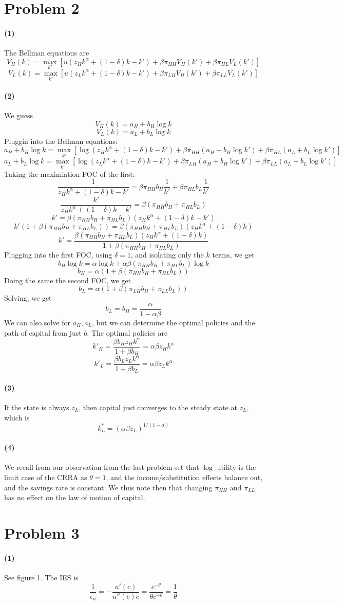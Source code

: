 \documentclass[10pt,letter]{article}
\newcommand{\problem}[1]{\section*{Problem #1}}
\newcommand{\problempart}[1]{\paragraph{#1}}
\begin{document}
\problem{2}
\problempart{(1)} The Bellman equations are
\[ V_H(k) = \max_{k'}\left[ u(z_H k^\alpha + (1-\delta) k - k') + \beta \pi_{HH}V_H(k')+ \beta \pi_{HL}V_L(k') \right] \]
\[ V_L(k) = \max_{k'}\left[ u(z_L k^\alpha + (1-\delta) k - k') + \beta \pi_{LH}V_H(k')+ \beta \pi_{LL}V_L(k') \right] \]
\problempart{(2)} We guess
\[ V_H(k) = a_H + b_H \log k \]
\[ V_L(k) = a_L + b_L \log k \]
Pluggin into the Bellman equations:
\[ a_H + b_H \log k = \max_{k'}\left[ \log(z_H k^\alpha + (1-\delta) k - k') + \beta \pi_{HH}(a_H + b_H \log k')+ \beta \pi_{HL}(a_L + b_L \log k') \right] \]
\[ a_L + b_L \log k = \max_{k'}\left[ \log(z_L k^\alpha + (1-\delta) k - k') + \beta \pi_{LH}(a_H + b_H \log k')+ \beta \pi_{LL}(a_L + b_L \log k') \right] \]
Taking the maximiation FOC of the first:
\[ \frac{1}{z_H k^\alpha + (1-\delta) k - k'} = \beta \pi_{HH} b_H \frac{1}{k'} + \beta \pi_{HL} b_L\frac{1}{k'}\]
\[ \frac{k'}{z_H k^\alpha + (1-\delta) k - k'} = \beta (\pi_{HH} b_H + \pi_{HL} b_L)\]
\[ k' = \beta (\pi_{HH} b_H + \pi_{HL} b_L)(z_H k^\alpha + (1-\delta) k - k')\]
\[ k'(1 + \beta (\pi_{HH} b_H + \pi_{HL} b_L)) = \beta (\pi_{HH} b_H + \pi_{HL} b_L)(z_H k^\alpha + (1-\delta) k )\]
\[ k' = \frac{\beta (\pi_{HH} b_H + \pi_{HL} b_L)(z_H k^\alpha + (1-\delta) k )}{1 + \beta (\pi_{HH} b_H + \pi_{HL} b_L)}\]
Plugging into the first FOC, using $\delta = 1$, and isolating only the $k$ terms, we get
\[ b_H \log k = \alpha \log k + \alpha \beta(\pi_{HH}b_H+ \pi_{HL}b_L) \log k \]
\[ b_H = \alpha( 1 + \beta(\pi_{HH}b_H+ \pi_{HL}b_L) ) \]
Doing the same the second FOC, we get
\[ b_L = \alpha( 1 + \beta(\pi_{LH}b_H + \pi_{LL}b_L)) \]
Solving, we get
\[ b_L = b_H = \frac{\alpha}{1 - \alpha \beta} \]
We can also solve for $a_H, a_L$, but we can determine the optimal policies and the path of capital from just $b$.
The optimal policies are
\[ k'_H = \frac{\beta b_H z_H k^\alpha }{1 + \beta b_H} = \alpha \beta z_H k^\alpha \]
\[ k'_L = \frac{\beta b_L z_L k^\alpha }{1 + \beta b_L}= \alpha \beta z_L k^\alpha \]
\problempart{(3)} If the state is always $z_L$, then capital just converges to the steady state at $z_L$, which is
\[ k^*_L = (\alpha \beta z_L)^{1/(1-\alpha)} \]
\problempart{(4)} We recall from our observation from the last problem set that $\log$ utility is the limit case of the CRRA as $\theta = 1$, and the income/substitution effects balance out, and the savings rate is constant. We thus note then that changing $\pi_{HH}$ and $\pi_{LL}$ has no effect on the law of motion of capital.
\pagebreak
\problem{3}
\problempart{(1)}
See figure 1.
The IES is
\[ \frac{1}{\epsilon_u} = -\frac{u'(c)}{u''(c)c} = \frac{c^{-\theta}}{\theta c^{-\theta}} = \frac{1}{\theta} \]
\end{document}
